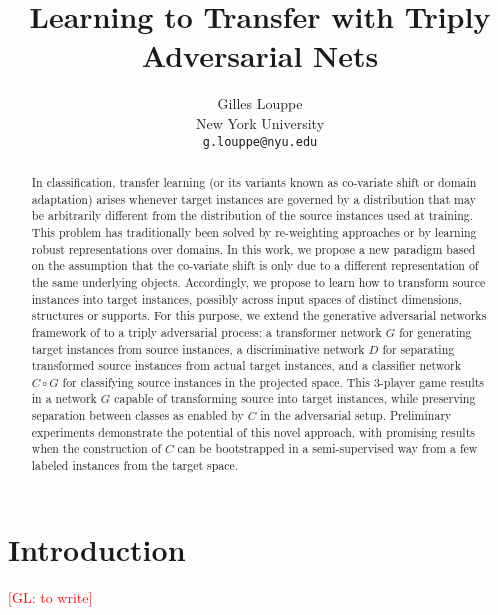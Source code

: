 \documentclass{article}
\title{Learning to Transfer with Triply Adversarial Nets}
\author{
Gilles Louppe \\
New York University\\
\texttt{g.louppe@nyu.edu} \\
}
\newcommand{\glnote}[1]{\textcolor{red}{[GL: #1]}}
\theoremstyle{plain}
\begin{document}
\maketitle

\begin{abstract}

In classification, transfer learning (or its variants known as co-variate shift
or domain adaptation) arises whenever target instances are governed by a
distribution that may be arbitrarily different from the distribution of the
source instances used at training. This problem has traditionally been solved by re-weighting
approaches or by learning robust representations over domains. In this work, we
propose a new paradigm based on the assumption that the co-variate shift is only
due to a different representation of the same underlying objects.
Accordingly, we propose to learn how to transform source instances into target
instances, possibly across input spaces of distinct dimensions, structures or
supports. For this purpose, we extend the generative adversarial networks
framework of \cite{goodfellow2014generative} to a triply adversarial process: a
transformer network $G$ for generating target instances from source instances, a
discriminative network $D$ for separating transformed source instances from
actual target instances, and a classifier network $C \circ G$ for classifying source
instances in the projected space. This 3-player game results in a network $G$
capable of transforming source into target instances, while preserving
separation between classes as enabled by $C$ in the adversarial setup.
Preliminary experiments demonstrate the potential of this novel approach, with promising
results when the construction of $C$ can be bootstrapped in a semi-supervised
way  from a few labeled instances from the target space.

\end{abstract}

\section{Introduction}

\glnote{to write}

\end{document}

